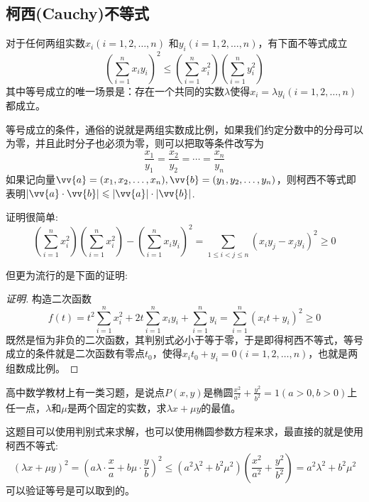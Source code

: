 \subsection{柯西(Cauchy)不等式}
\label{sec:cauchy-schwarz-inequation}

\begin{theorem}[柯西不等式]
  对于任何两组实数$x_i(i=1,2,\ldots,n)$ 和$y_i(i=1,2,\ldots,n)$，有下面不等式成立
  \begin{equation}
    \label{eq:cauchy-inequation}
    \left( \sum_{i=1}^nx_iy_i \right)^{2} \leqslant \left( \sum_{i=1}^{n}x_i^2 \right) \left( \sum_{i=1}^ny_i^{2} \right)
  \end{equation}
  其中等号成立的唯一场景是：存在一个共同的实数$\lambda$使得$x_i=\lambda y_{i}(i=1,2,\ldots,n)$都成立。
\end{theorem}
等号成立的条件，通俗的说就是两组实数成比例，如果我们约定分数中的分母可以为零，并且此时分子也必须为零，则可以把取等条件改写为
\begin{equation*}
  \frac{x_1}{y_1} = \frac{x_2}{y_2} = \cdots = \frac{x_n}{y_n}
\end{equation*}
如果记向量$\vv{a}=(x_1,x_2,\ldots,x_n), \vv{b}=(y_1,y_2,\ldots,y_n)$，则柯西不等式即表明$|\vv{a} \cdot \vv{b}| \leqslant |\vv{a}| \cdot |\vv{b}|$.

证明很简单:
\begin{equation*}
  \left( \sum_{i=1}^nx_i^2 \right) \left( \sum_{i=1}^nx_i^2 \right) - \left( \sum_{i=1}^nx_iy_i \right)^2 = \sum_{1 \leqslant i < j \leqslant n}(x_iy_j-x_jy_i)^2 \geqslant 0
\end{equation*}

但更为流行的是下面的证明:

\begin{proof}[证明]
  构造二次函数
  \begin{equation*}
  f(t)=t^2\sum_{i=1}^nx_i^2+2t\sum_{i=1}^nx_iy_i+\sum_{i=1}^ny_i=\sum_{i=1}^n(x_it+y_i)^2 \geqslant 0
  \end{equation*}
 既然是恒为非负的二次函数，其判别式必小于等于零，于是即得柯西不等式，等号成立的条件就是二次函数有零点$t_0$，使得$x_it_0+y_i=0(i=1,2,\ldots,n)$，也就是两组数成比例。
\end{proof}

\begin{example}
  高中数学教材上有一类习题，是说点$P(x,y)$是椭圆$\frac{x^2}{a^2}+\frac{y^2}{b^2}=1(a>0, b>0)$上任一点，$\lambda$和$\mu$是两个固定的实数，求$\lambda x + \mu y$的最值。

  这题目可以使用判别式来求解，也可以使用椭圆参数方程来求，最直接的就是使用柯西不等式:
  \begin{equation*}
    (\lambda x + \mu y)^2 = (a\lambda \cdot \frac{x}{a} + b\mu \cdot \frac{y}{b})^2 \leqslant (a^2\lambda^2+b^2\mu^2)(\frac{x^2}{a^2}+\frac{y^2}{b^2}) = a^2\lambda^2+b^2\mu^2
  \end{equation*}
  可以验证等号是可以取到的。
\end{example}

